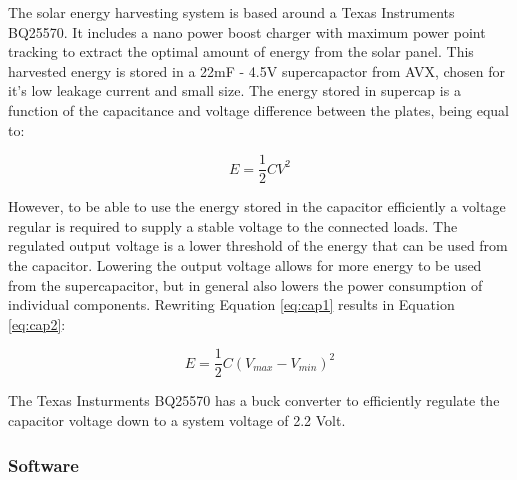 \documentclass[letterpaper, 10 pt, conference]{ieeeconf}  %
\begin{document}

The solar energy harvesting system is based around a Texas Instruments BQ25570. 
It includes a nano power boost charger with maximum power point tracking to extract the optimal amount of energy from the solar panel. 
This harvested energy is stored in a 22mF - 4.5V supercapactor from AVX, chosen for it's low leakage current and small size.
The energy stored in supercap is a function of the capacitance and voltage difference between the plates, being equal to:

\begin{equation}
\label{eq:cap1}
E = \frac{1}{2}CV^{2}
\end{equation}

However, to be able to use the energy stored in the capacitor efficiently a voltage regular is required to supply a stable voltage to the connected loads.
The regulated output voltage is a lower threshold of the energy that can be used from the capacitor.
Lowering the output voltage allows for more energy to be used from the supercapacitor, but in general also lowers the power consumption of individual components. Rewriting Equation \ref{eq:cap1} results in Equation \ref{eq:cap2}:

\begin{equation}
\label{eq:cap2}
E = \frac{1}{2}C(V_{max} - V_{min})^{2}
\end{equation}

The Texas Insturments BQ25570 has a buck converter to efficiently regulate the capacitor voltage down to a system voltage of 2.2 Volt.


\subsubsection{Software}



\end{document}
